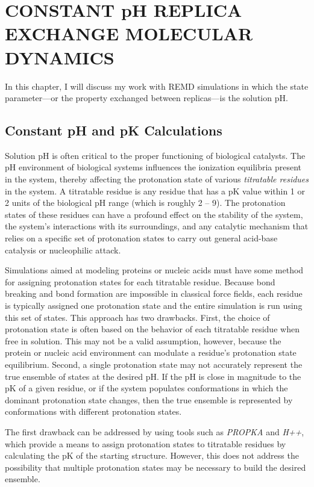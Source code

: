 \chapter{CONSTANT pH REPLICA EXCHANGE MOLECULAR DYNAMICS}
\label{ch3}

In this chapter, I will discuss my work with REMD simulations in which the state
parameter---or the property exchanged between replicas---is the solution pH.

\section{Constant pH and pK Calculations}

Solution pH is often critical to the proper functioning of biological catalysts.
\cite{Cornish-Bowden1969,White1959} The pH environment of biological systems
influences the ionization equilibria present in the system, thereby affecting
the protonation state of various \emph{titratable residues} in the system. A
titratable residue is any residue that has a pK value within 1 or 2 units
of the biological pH range (which is roughly 2 -- 9). The protonation states of
these residues can have a profound effect on the stability of the system, the
system's interactions with its surroundings, and any catalytic mechanism that
relies on a specific set of protonation states to carry out general acid-base
catalysis or nucleophilic attack. \cite{Tanford1957}

Simulations aimed at modeling proteins or nucleic acids must have some method
for assigning protonation states for each titratable residue. Because bond
breaking and bond formation are impossible in classical force fields, each
residue is typically assigned one protonation state and the entire simulation is
run using this set of states. This approach has two drawbacks. First, the
choice of protonation state is often based on the behavior of each titratable
residue when free in solution. This may not be a valid assumption, however,
because the protein or nucleic acid environment can modulate a residue's
protonation state equilibrium. Second, a single protonation state may not
accurately represent the true ensemble of states at the desired pH. If the pH
is close in magnitude to the pK of a given residue, or if the system
populates conformations in which the dominant protonation state changes, then
the true ensemble is represented by conformations with different protonation
states.

The first drawback can be addressed by using tools such as \emph{PROPKA}
\cite{Olsson2011} and \emph{H++}, \cite{Myers2006} which provide a means to
assign protonation states to titratable residues by calculating the pK of
the starting structure. However, this does not address the possibility that
multiple protonation states may be necessary to build the desired ensemble.

